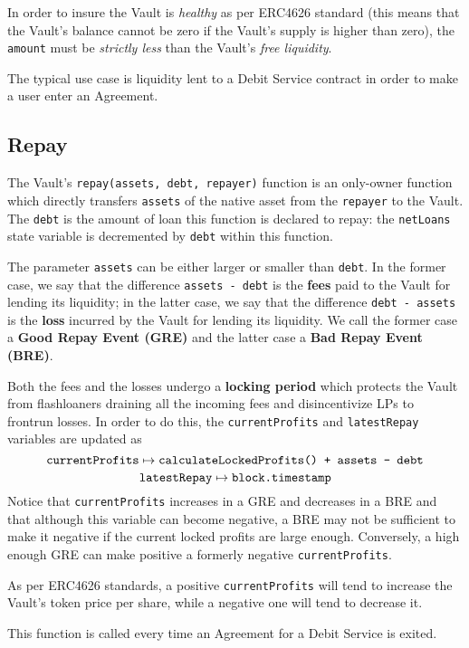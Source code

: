 \documentclass[a4paper,10 pt]{article}
\theoremstyle{definition}
\begin{document}
In order to insure the Vault is {\it healthy} as per ERC4626 standard (this means that the Vault's balance cannot be zero if the Vault's supply is higher than zero),  the \verb|amount| must be {\it strictly less} than the Vault's {\it free liquidity}.

The typical use case is liquidity lent to a Debit Service contract in order to make a user enter an Agreement.

\subsection{Repay}\label{repaySub}

The Vault's \verb|repay(assets, debt, repayer)| function is an only-owner function which directly transfers \verb|assets| of the native asset from the \verb|repayer| to the Vault. The \verb|debt| is the amount of loan this function is declared to repay: the \verb|netLoans| state variable is decremented by \verb|debt| within this function.

The parameter \verb|assets| can be either larger or smaller than \verb|debt|. In the former case, we say that the difference \verb|assets - debt| is the {\bf fees} paid to the Vault for lending its liquidity; in the latter case, we say that the difference \verb|debt - assets| is the {\bf loss} incurred by the Vault for lending its liquidity. We call the former case a {\bf Good Repay Event (GRE)} and the latter case a {\bf Bad Repay Event (BRE)}. 

Both the fees and the losses undergo a {\bf locking period} which protects the Vault from flashloaners draining all the incoming fees and disincentivize LPs to frontrun losses. In order to do this, the \verb|currentProfits| and \verb|latestRepay| variables are updated as 
$$\verb|currentProfits| \mapsto \verb|calculateLockedProfits() + assets - debt|$$ 
$$\verb|latestRepay| \mapsto \verb|block.timestamp|$$ 
Notice that \verb|currentProfits| increases in a GRE and decreases in a BRE and that although this variable can become negative, a BRE may not be sufficient to make it negative if the current locked profits are large enough. Conversely, a high enough GRE can make positive a formerly negative \verb|currentProfits|.

As per ERC4626 standards, a positive \verb|currentProfits| will tend to increase the Vault's token price per share, while a negative one will tend to decrease it.

This function is called every time an Agreement for a Debit Service is exited.
\end{document}
